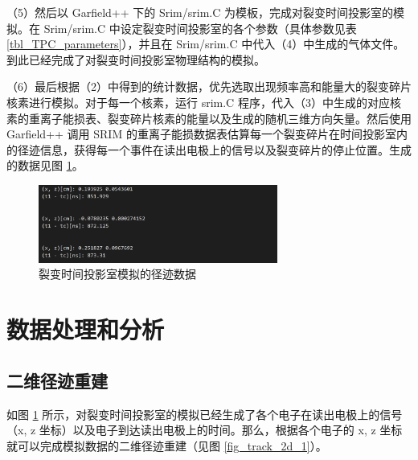 \documentclass[AutoFakeBold]{LZUThesis}
\begin{document}
（5）然后以 Garfield++ 下的 Srim/srim.C 为模板，完成对裂变时间投影室的模拟。在 Srim/srim.C 中设定裂变时间投影室的各个参数（具体参数见表 \ref{tbl_TPC_parameters}），并且在 Srim/srim.C 中代入（4）中生成的气体文件。到此已经完成了对裂变时间投影室物理结构的模拟。

（6）最后根据（2）中得到的统计数据，优先选取出现频率高和能量大的裂变碎片核素进行模拟。对于每一个核素，运行 srim.C 程序，代入（3）中生成的对应核素的重离子能损表、裂变碎片核素的能量以及生成的随机三维方向矢量。然后使用 Garfield++ 调用 SRIM 的重离子能损数据表估算每一个裂变碎片在时间投影室内的径迹信息，获得每一个事件在读出电极上的信号以及裂变碎片的停止位置。生成的数据见图 \ref{fig_output}。

\begin{figure}[H]
    \centering
    \includegraphics[width=0.7\textwidth]{figures/output.png}
    \caption{裂变时间投影室模拟的径迹数据}
    \label{fig_output}
\end{figure}




\section{数据处理和分析}
\subsection{二维径迹重建}
\label{sub:二维径迹重建}
如图 \ref{fig_output} 所示，对裂变时间投影室的模拟已经生成了各个电子在读出电极上的信号（x, z 坐标）以及电子到达读出电极上的时间。那么，根据各个电子的 x, z 坐标就可以完成模拟数据的二维径迹重建（见图 \ref{fig_track_2d_1}）。
\end{document}

